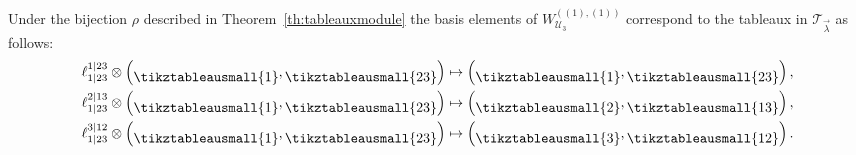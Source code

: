 \begin{example}
Under the bijection $\rho$ described in Theorem~\ref{th:tableauxmodule} the basis elements of $W^{((1),(1))}_{\mathcal{U}_3}$ correspond to the tableaux in
$\mathcal{T}_{\vec{\lambda}}$ as follows:
\begin{align*}
&\ell_{1|23}^{1|23}\otimes  \left(
\raisebox{-.05in}{\tikztableausmall{{1}}},\raisebox{-.05in}{\tikztableausmall{{23}}} \right) \mapsto \left(\raisebox{-.05in}{\tikztableausmall{{1}}},\raisebox{-.05in}{\tikztableausmall{{23}}} \right),\\
& \ell_{1|23}^{2|13}\otimes \left(
\raisebox{-.05in}{\tikztableausmall{{1}}},\raisebox{-.05in}{\tikztableausmall{{23}}} \right) \mapsto
\left(\raisebox{-.05in}{\tikztableausmall{{2}}},\raisebox{-.05in}{\tikztableausmall{{13}}} \right),\\
&\ell_{1|23}^{3|12}\otimes \left(
\raisebox{-.05in}{\tikztableausmall{{1}}},\raisebox{-.05in}{\tikztableausmall{{23}}} \right) \mapsto
\left(\raisebox{-.05in}{\tikztableausmall{{3}}},\raisebox{-.05in}{\tikztableausmall{{12}}} \right).
\end{align*}
\end{example}

